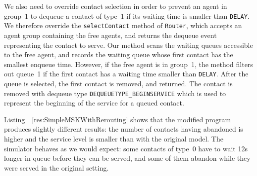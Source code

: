 We also need to override contact selection in order to prevent an
agent in group~1 to dequeue a contact of type~1 if its waiting time is
smaller than \texttt{DELAY}.  We therefore override the
\texttt{select\-Contact}
method of \texttt{Router}, which accepts an agent group containing the
free agents, and returns the dequeue event representing the
contact to serve.
Our method scans the waiting queues accessible to the free agent, and
records the waiting queue whose first contact has the smallest enqueue
time. However, if the free agent is in group~1, the method filters out
queue~1 if the first contact has a waiting time smaller than
\texttt{DELAY}.
After the queue is selected, the first contact is removed, and
returned.  The contact is removed with dequeue type
\texttt{DEQUEUETYPE\_BEGINSERVICE} which is used to represent the
beginning of the service for a queued contact.

Listing~ \ref{res:SimpleMSKWithRerouting} shows that the modified
program produces slightly different results: the number of contacts
having abandoned is higher and the service level is smaller than with
the original model.  The simulator behaves as we would expect:
some contacts of type~0 have to wait 12s longer in queue before they
can be served, and some of them abandon while they were served in the
original setting.


